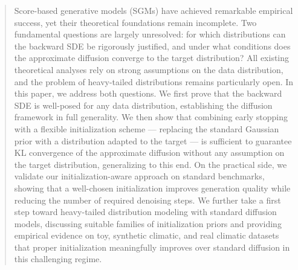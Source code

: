 \begin{abstract}
Score-based generative models (SGMs) have achieved remarkable empirical success, yet their theoretical foundations remain incomplete. Two fundamental questions are largely unresolved: for which distributions can the backward SDE be rigorously justified, and under what conditions does the approximate diffusion converge to the target distribution? All existing theoretical analyses rely on strong assumptions on the data distribution, and the problem of heavy-tailed distributions remains particularly open.
In this paper, we address both questions. We first prove that the backward SDE is well-posed for any data distribution, establishing the diffusion framework in full generality. We then show that combining early stopping with a flexible initialization scheme — replacing the standard Gaussian prior with a distribution adapted to the target — is sufficient to guarantee KL convergence of the approximate diffusion without any assumption on the target distribution, generalizing \cite[Theorem 1]{conforti2023kl} to this end.
On the practical side, we validate our initialization-aware approach on standard benchmarks, showing that a well-chosen initialization improves generation quality while reducing the number of required denoising steps. We further take a first step toward heavy-tailed distribution modeling with standard diffusion models, discussing suitable families of initialization priors and providing empirical evidence on toy, synthetic climatic, and real climatic datasets that proper initialization meaningfully improves over standard diffusion in this challenging regime.
\end{abstract}